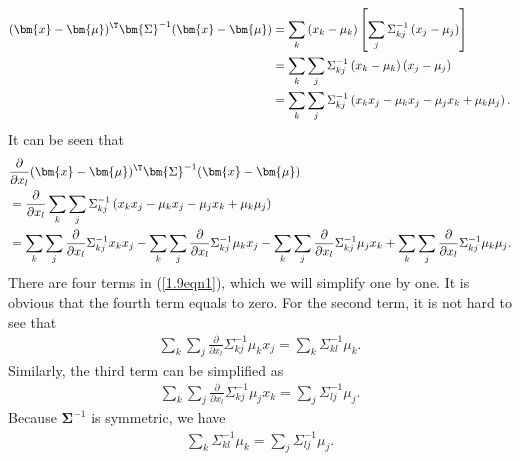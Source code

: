 \begin{answer}{}
	\begin{align}
		(\bm{x}-\bm{\mu})^\T\bm{\Sigma}^{-1}(\bm{x}-\bm{\mu}) &= \sum_k \left(x_k - \mu_k\right)\left[\sum_j \Sigma_{kj}^{-1} \left(x_j - \mu_j\right)\right]\\
		&= \sum_k \sum_j \Sigma_{kj}^{-1} \left(x_k - \mu_k\right) \left(x_j - \mu_j\right)\\
		&=  \sum_k \sum_j \Sigma_{kj}^{-1} \left(x_k x_j - \mu_k x_j - \mu_j x_k + \mu_k \mu_j\right).
	\end{align}
	It can be seen that
	\begin{align}
		&\frac{\partial}{\partial x_l} (\bm{x}-\bm{\mu})^\T\bm{\Sigma}^{-1}(\bm{x}-\bm{\mu})\\
		&= \frac{\partial}{\partial x_l} \sum_k \sum_j \Sigma_{kj}^{-1} \left(x_k x_j - \mu_k x_j - \mu_j x_k + \mu_k \mu_j\right)\\
		&= \sum_k \sum_j \frac{\partial}{\partial x_l} \Sigma_{kj}^{-1}x_k x_j - \sum_k \sum_j \frac{\partial}{\partial x_l} \Sigma_{kj}^{-1} \mu_k x_j - \sum_k \sum_j \frac{\partial}{\partial x_l} \Sigma_{kj}^{-1} \mu_j x_k + \sum_k \sum_j \frac{\partial}{\partial x_l} \Sigma_{kj}^{-1} \mu_k \mu_j. \label{1.9eqn1}
	\end{align}
	There are four terms in (\ref{1.9eqn1}), which we will simplify one by one. It is obvious that the fourth term equals to zero. For the second term, it is not hard to see that
	\begin{align}
		\sum_k \sum_j \frac{\partial}{\partial x_l} \Sigma_{kj}^{-1} \mu_k x_j = \sum_k \Sigma_{kl}^{-1} \mu_k.
	\end{align}
	Similarly, the third term can be simplified as
	\begin{align}
		\sum_k \sum_j \frac{\partial}{\partial x_l} \Sigma_{kj}^{-1} \mu_j x_k = \sum_j \Sigma_{lj}^{-1} \mu_j.
	\end{align}
	Because $\bm{\Sigma}^{-1}$ is symmetric, we have
	\begin{align}
		\sum_k \Sigma_{kl}^{-1} \mu_k = \sum_j \Sigma_{lj}^{-1} \mu_j.
	\end{align}%
	\begin{comment}
		The first term is a bit more complicated. It can be seen that
		\begin{equation}\label{1.9eqn2}
		\frac{\partial}{\partial x_l} \Sigma_{kj}^{-1}x_k x_j = 
		\begin{cases}
		2\Sigma_{ll}^{-1}x_l, &\mbox{$k = l$ and $j = l$}\\
		\left(\sum_j \Sigma_{lj}^{-1} x_j\right) - \Sigma_{ll}^{-1}x_l, &\mbox{$k = l$ and $j \neq l$}\\

\end{comment}
\end{answer}
